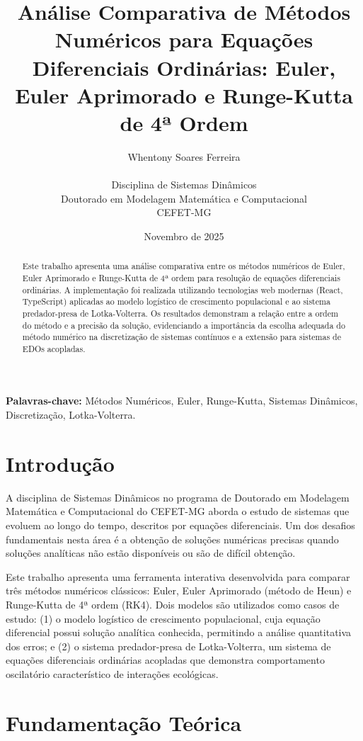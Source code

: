 \documentclass[11pt,a4paper]{article}
\title{\textbf{Análise Comparativa de Métodos Numéricos para Equações Diferenciais Ordinárias: Euler, Euler Aprimorado e Runge-Kutta de 4ª Ordem}}
\author{
    Whentony Soares Ferreira\\
    \\
    Disciplina de Sistemas Dinâmicos\\
    Doutorado em Modelagem Matemática e Computacional\\
    CEFET-MG
}
\date{Novembro de 2025}
\begin{document}
\maketitle

\begin{abstract}
Este trabalho apresenta uma análise comparativa entre os métodos numéricos de Euler, Euler Aprimorado e Runge-Kutta de 4ª ordem para resolução de equações diferenciais ordinárias. A implementação foi realizada utilizando tecnologias web modernas (React, TypeScript) aplicadas ao modelo logístico de crescimento populacional e ao sistema predador-presa de Lotka-Volterra. Os resultados demonstram a relação entre a ordem do método e a precisão da solução, evidenciando a importância da escolha adequada do método numérico na discretização de sistemas contínuos e a extensão para sistemas de EDOs acopladas.
\end{abstract}

\textbf{Palavras-chave:} Métodos Numéricos, Euler, Runge-Kutta, Sistemas Dinâmicos, Discretização, Lotka-Volterra.

\section{Introdução}

A disciplina de Sistemas Dinâmicos no programa de Doutorado em Modelagem Matemática e Computacional do CEFET-MG aborda o estudo de sistemas que evoluem ao longo do tempo, descritos por equações diferenciais. Um dos desafios fundamentais nesta área é a obtenção de soluções numéricas precisas quando soluções analíticas não estão disponíveis ou são de difícil obtenção.

Este trabalho apresenta uma ferramenta interativa desenvolvida para comparar três métodos numéricos clássicos: Euler, Euler Aprimorado (método de Heun) e Runge-Kutta de 4ª ordem (RK4). Dois modelos são utilizados como casos de estudo: (1) o modelo logístico de crescimento populacional, cuja equação diferencial possui solução analítica conhecida, permitindo a análise quantitativa dos erros; e (2) o sistema predador-presa de Lotka-Volterra, um sistema de equações diferenciais ordinárias acopladas que demonstra comportamento oscilatório característico de interações ecológicas.

\section{Fundamentação Teórica}
\end{document}
